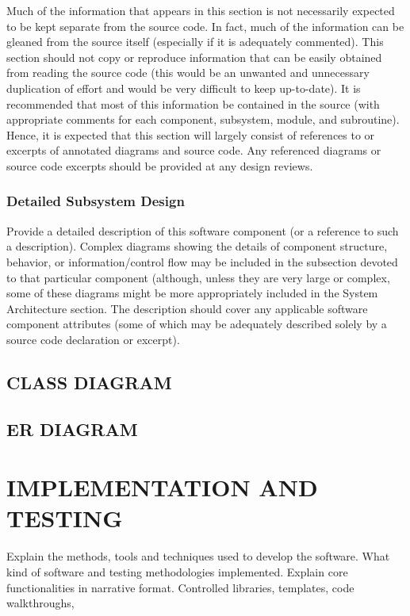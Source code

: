 \documentclass[12pt, a4paper]{report}
\begin{document}
Much of the information that appears in this section is not necessarily expected to be kept separate from the source code. In fact, much of the information can be gleaned from the source itself (especially if it is adequately commented). This section should not copy or reproduce information that can be easily obtained from reading the source code (this would be an unwanted and unnecessary duplication of effort and would be very difficult to keep up-to-date). It is recommended that most of this information be contained in the source (with appropriate comments for each component, subsystem, module, and subroutine). Hence, it is expected that this section will largely consist of references to or excerpts of annotated diagrams and source code. Any referenced diagrams or source code excerpts should be provided at any design reviews.
\subsection{Detailed Subsystem Design}
Provide a detailed description of this software component (or a reference to such a description). Complex diagrams showing the details of component structure, behavior, or information/control flow may be included in the subsection devoted to that particular component (although, unless they are very large or complex, some of these diagrams might be more appropriately included in the System Architecture section. The description should cover any applicable software component attributes (some of which may be adequately described solely by a source code declaration or excerpt). 

\section{CLASS DIAGRAM}
\section{ER DIAGRAM}

\chapter{IMPLEMENTATION AND TESTING}
Explain the methods, tools and techniques used to develop the software. What kind of software and testing methodologies implemented. Explain core functionalities in narrative format. Controlled libraries, templates, code walkthroughs, 
\end{document}
